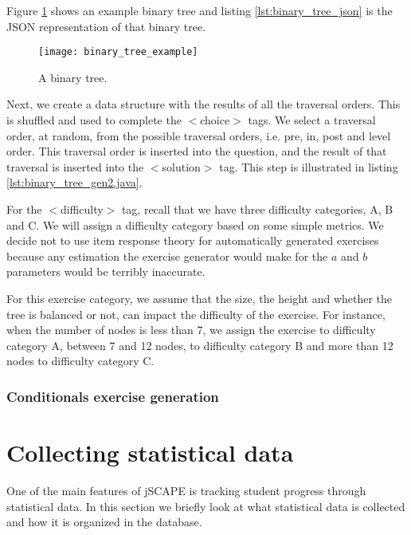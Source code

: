 Figure \ref{fig:binary_tree_example} shows an example binary tree and listing \ref{lst:binary_tree_json} is the JSON representation of that binary tree. 

\begin{figure}[H]
\centering
\texttt{[image: binary\_tree\_example]}
\caption{A binary tree.}
\label{fig:binary_tree_example}
\end{figure}



\newpage

Next, we create a data structure with the results of all the traversal orders. This is shuffled and used to complete the \textsf{$<$choice$>$} tags. We select a traversal order, at random, from the possible traversal orders, i.e. pre, in, post and level order. This traversal order is inserted into the question, and the result of that traversal is inserted into the \textsf{$<$solution$>$} tag. This step is illustrated in listing \ref{lst:binary_tree_gen2.java}. \newline



For the \textsf{$<$difficulty$>$} tag, recall that we have three difficulty categories, A, B and C. We will assign a difficulty category based on some simple metrics. We decide not to use item response theory for automatically generated exercises because any estimation the exercise generator would make for the $a$ and $b$ parameters would be terribly inaccurate.\newline

For this exercise category, we assume that the size, the height and whether the tree is balanced or not, can impact the difficulty of the exercise. For instance, when the number of nodes is less than 7, we assign the exercise to difficulty category A, between 7 and 12 nodes, to difficulty category B and more than 12 nodes to difficulty category C.

\subsubsection{Conditionals exercise generation}

\section{Collecting statistical data}
One of the main features of jSCAPE is tracking student progress through statistical data. In this section we briefly look at what statistical data is collected and how it is organized in the database.

